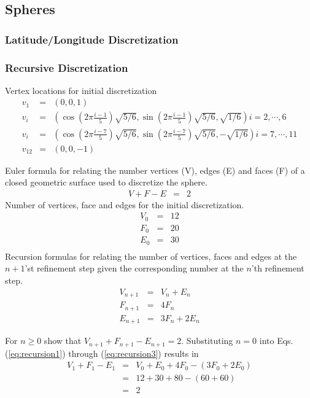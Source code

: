 \documentclass[12pt]{article}
\begin{document}
\subsection{Spheres}
\subsubsection{Latitude/Longitude Discretization}
\subsubsection{Recursive Discretization}
Vertex locations for initial discretization
\begin{eqnarray*}
v_1&=&(0,0,1)\\
v_i&=&\left(\cos\left(2\pi\frac{i-1}{5}\right)\sqrt{5/6},\sin\left(2\pi\frac{i-1}{5}\right)\sqrt{5/6},\sqrt{1/6}\right)i=2,\cdots, 6\\
v_i&=&\left(\cos\left(2\pi\frac{i-7}{5}\right)\sqrt{5/6},\sin\left(2\pi\frac{i-7}{5}\right)\sqrt{5/6},-\sqrt{1/6}\right)i=7,\cdots, 11\\
v_{12}&=&(0,0,-1)
\end{eqnarray*}

Euler formula for relating the number vertices (V), edges (E) and faces (F) of a closed geometric surface used to discretize the sphere.
\begin{eqnarray*}
V+F-E&=&2
\end{eqnarray*}
Number of vertices, face and edges for the initial discretization.
\begin{eqnarray*}
V_0&=&12\\
F_0&=&20\\
E_0&=&30\\
\end{eqnarray*}
Recursion formulas for relating the number of vertices, faces and edges at the $n+1$'st refinement step given the corresponding number at the $n$'th refinement step.
\begin{eqnarray}
\label{eq:recursion1}
V_{n+1}&=&V_n+E_n\\
\label{eq:recursion2}
F_{n+1}&=&4 F_n\\
\label{eq:recursion3}
E_{n+1}&=&3 F_n+2 E_n
\end{eqnarray}

For $n\ge 0$ show that $V_{n+1}+F_{n+1}-E_{n+1}=2$.
Substituting $n=0$ into Eqs. (\ref{eq:recursion1}) through (\ref{eq:recursion3})  results in
\begin{eqnarray*}
V_1+F_1-E_1&=&V_0+E_0+4 F_0 -(3 F_0+2 E_0)\\
&=&12+30+80-(60+60)\\
&=&2
\end{eqnarray*}
\end{document}
